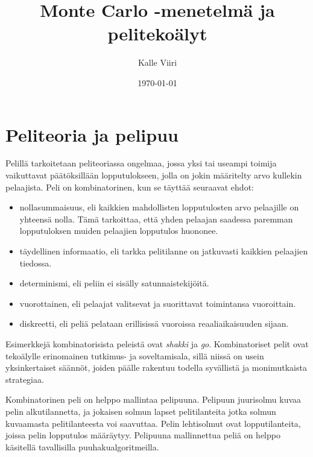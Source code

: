 \documentclass[12pt,finnish]{tktltiki2}
\title{Monte Carlo -menetelmä ja pelitekoälyt}
\author{Kalle Viiri}
\date{\today}
\theoremstyle{definition}
\theoremstyle{remark}
\begin{document}

\frontmatter      %

\maketitle        %
\makeabstract     %

\tableofcontents  %


\mainmatter       %

\section{Peliteoria ja pelipuu}

Pelillä tarkoitetaan peliteoriassa ongelmaa, jossa yksi tai useampi toimija vaikuttavat päätöksillään lopputulokseen, jolla on jokin määritelty arvo kullekin pelaajista. Peli on kombinatorinen, kun se täyttää seuraavat ehdot:~\cite{browne}

\begin{itemize}
	\item nollasummaisuus, eli kaikkien mahdollisten lopputulosten arvo pelaajille on yhteensä nolla. Tämä tarkoittaa, että yhden pelaajan saadessa paremman lopputuloksen muiden pelaajien lopputulos huononee.
	 \item täydellinen informaatio, eli tarkka pelitilanne on jatkuvasti kaikkien pelaajien tiedossa.
	 \item determinismi, eli peliin ei sisälly satunnaistekijöitä.
	 \item vuorottainen, eli pelaajat valitsevat ja suorittavat toimintansa vuoroittain.
	 \item diskreetti, eli peliä pelataan erillisissä vuoroissa reaaliaikaisuuden sijaan.
\end{itemize}

Esimerkkejä kombinatorisista peleistä ovat \textit{shakki} ja \textit{go}. Kombinatoriset pelit ovat tekoälylle erinomainen tutkimus- ja soveltamisala, sillä niissä on usein yksinkertaiset säännöt, joiden päälle rakentuu todella syvällistä ja monimutkaista strategiaa.~\cite{browne}

Kombinatorinen peli on helppo mallintaa pelipuuna. Pelipuun juurisolmu kuvaa pelin alkutilannetta, ja jokaisen solmun lapset pelitilanteita jotka solmun kuvaamasta pelitilanteesta voi saavuttaa. Pelin lehtisolmut ovat lopputilanteita, joissa pelin lopputulos määräytyy. Pelipuuna mallinnettua peliä on helppo käsitellä tavallisilla puuhakualgoritmeilla.~\cite{aima}
\end{document}
